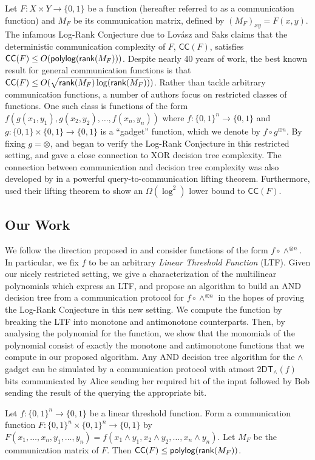 Let $F: X\times Y\to \{0,1\}$ be a function (hereafter referred to as a communication function) and $M_F$ be its communication matrix, defined by $(M_F)_{xy} = F(x,y)$. The infamous Log-Rank Conjecture due to Lov\'{a}sz and Saks \cite{Lovasz1988} claims that the deterministic communication complexity of $F$, $\mathsf{CC}(F)$, satisfies $\mathsf{CC}(F) \leq O(\mathsf{polylog}(\mathsf{rank}(M_F)))$. Despite nearly 40 years of work, the best known result for general communication functions is that $\mathsf{CC}(F) \leq O(\sqrt{\mathsf{rank}(M_F)\log(\mathsf{rank}(M_F))})$. Rather than tackle arbitrary communication functions, a number of authors focus on restricted classes of functions. One such class is functions of the form $f(g(x_1,y_1),g(x_2,y_2),\dots,f(x_n,y_n))$ where $f : \{0,1\}^n \to \{0,1\}$ and $g : \{0,1\}\times\{0,1\}\to\{0,1\}$ is a ``gadget'' function, which we denote by $f \circ g^{\oplus n}$. By fixing $g = \otimes$, \cite{Tsang2013} and \cite{Lovett2016} began to verify the Log-Rank Conjecture in this restricted setting, and gave a close connection to XOR decision tree complexity. The connection between communication and decision tree complexity was also developed by \cite{Goos2015} in a powerful query-to-communication lifting theorem. Furthermore, \cite{Goos2015} used their lifting theorem to show an $\Omega(\log^2)$ lower bound to $\mathsf{CC}(F)$.

\subsection{Our Work}

We follow the direction proposed in \cite{Lovett2016} and consider functions of the form $f\circ \wedge^{\otimes n}$. In particular, we fix $f$ to be an arbitrary \textit{Linear Threshold Function} (LTF). Given our nicely restricted setting, we give a characterization of the multilinear polynomials which express an LTF, and propose an algorithm to build an AND decision tree from a communication protocol for $f\circ \wedge^{\otimes n}$ in the hopes of proving the Log-Rank Conjecture in this new setting. We compute the function by breaking the LTF into monotone and antimonotone counterparts. Then, by analysing the polynomial for the function, we show that the monomials of the polynomial consist of exactly the monotone and antimonotone functions that we compute in our proposed algorithm. Any \textsf{AND} decision tree algorithm for the $\wedge$ gadget can be simulated by a communication protocol with atmost $2\mathsf{DT}_\wedge(f)$ bits communicated by Alice sending her required bit of the input followed by Bob sending the result of the querying the appropriate bit. 
\begin{theorem}\label{mainresult}
	Let $f : \{0,1\}^n\to\{0,1\}$ be a linear threshold function. Form a communication function $F: \{0,1\}^n\times \{0,1\}^n\to\{0,1\}$ by $F(x_1,\dots,x_n,y_1,\dots,y_n)  = f(x_1 \wedge y_1,x_2\wedge y_2,\dots,x_n\wedge y_n)$. Let  $M_F$ be the communication matrix of $F$. Then $\mathsf{CC}(F) \leq \mathsf{polylog}(\mathsf{rank}(M_F))$. 
\end{theorem}
